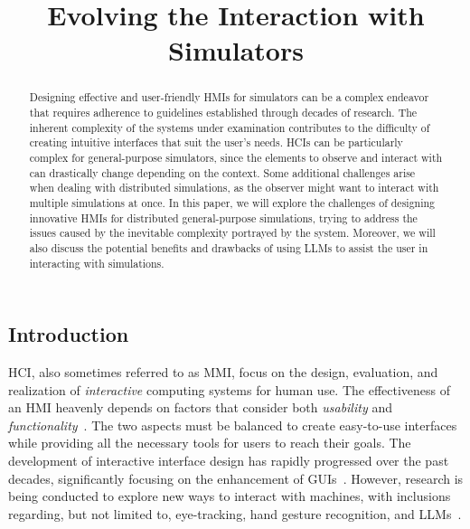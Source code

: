 \documentclass[conference]{IEEEtran}
\begin{document}
\title{Evolving the Interaction with Simulators\\
}

\author{
}

\maketitle

\begin{abstract}
    Designing effective and user-friendly \acp{HMI} for simulators can be a complex endeavor that requires adherence to guidelines
    established through decades of research.
    The inherent complexity of the systems under examination contributes to the difficulty of creating intuitive interfaces that suit the user's needs.
    \acp{HCI} can be particularly complex for general-purpose simulators,
    since the elements to observe and interact with can drastically change depending on the context.
    Some additional challenges arise when dealing with distributed simulations,
    as the observer might want to interact with multiple simulations at once.
    In this paper,
    we will explore the challenges of designing innovative \acp{HMI} for distributed general-purpose simulations,
    trying to address the issues caused by the inevitable complexity portrayed by the system.
    Moreover,
    we will also discuss the potential benefits and drawbacks of using \acp{LLM} to assist the user in interacting with simulations.
\end{abstract}


\subsection{Introduction}
\ac{HCI},
also sometimes referred to as \ac{MMI},
focus on the design, evaluation, and realization of \emph{interactive} computing systems for human use.
The effectiveness of an \ac{HMI} heavenly depends on factors that consider both \emph{usability} and \emph{functionality}~\cite{Sinha2010}.
%
The two aspects must be balanced to create easy-to-use interfaces
while providing all the necessary tools for users to reach their goals.
%
The development of interactive interface design has rapidly progressed over the past decades,
significantly focusing on the enhancement of \acp{GUI}~\cite{Murad2019}.
%
However,
research is being conducted to explore new ways to interact with machines,
with inclusions regarding,
but not limited to,
eye-tracking,
hand gesture recognition,
and \acp{LLM}~\cite{Poole2006, Sarma2021, kapania2024imcategorizingllmproductivity}.
\end{document}
